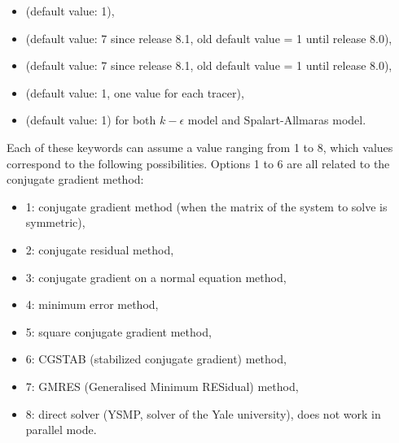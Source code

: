 \begin{itemize}
\item {} (default value: 1),

\item {} (default value: 7
  since release 8.1, old default value = 1 until release 8.0),

\item {} (default value: 7
  since release 8.1, old default value = 1 until release 8.0),

%
\item {} (default value: 1, one value for
each tracer),

\item {} (default value: 1)
for both $k-\epsilon$ model and Spalart-Allmaras model.
\end{itemize}

Each of these keywords can assume a value ranging from 1 to 8, which values
correspond to the following possibilities.
Options 1 to 6 are all related to the conjugate gradient method:

\begin{itemize}
\item 1: conjugate gradient method (when the matrix of the system to solve
is symmetric),

\item 2: conjugate residual method,

\item 3: conjugate gradient on a normal equation method,

\item 4: minimum error method,

\item 5: square conjugate gradient method,

\item 6: CGSTAB (stabilized conjugate gradient) method,

\item 7: GMRES (Generalised Minimum RESidual) method,

\item 8: direct solver (YSMP, solver of the Yale university),
does not work in parallel mode.
\end{itemize}

